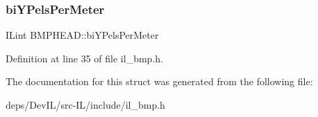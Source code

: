 \subsubsection{\texorpdfstring{bi\+Y\+Pels\+Per\+Meter}{biYPelsPerMeter}}
{\footnotesize\ttfamily I\+Lint B\+M\+P\+H\+E\+A\+D\+::bi\+Y\+Pels\+Per\+Meter}



Definition at line 35 of file il\+\_\+bmp.\+h.



The documentation for this struct was generated from the following file\+:\begin{DoxyCompactItemize}
\item 
deps/\+Dev\+I\+L/src-\/\+I\+L/include/il\+\_\+bmp.\+h\end{DoxyCompactItemize}
